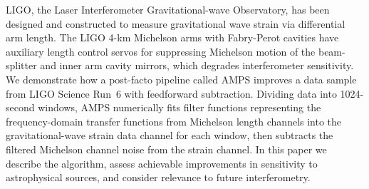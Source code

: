 LIGO, the Laser Interferometer Gravitational-wave Observatory, has been designed and constructed to measure gravitational wave strain via differential arm length. The LIGO 4-km Michelson arms with Fabry-Perot cavities have auxiliary length control servos for suppressing Michelson motion of the beam-splitter and inner arm cavity mirrors, which degrades interferometer sensitivity. We demonstrate how a post-facto pipeline called AMPS improves a data sample from LIGO Science Run~6 with feedforward subtraction. Dividing data into 1024-second windows, AMPS numerically fits filter functions representing the frequency-domain transfer functions from Michelson length channels into the gravitational-wave strain data channel for each window, then subtracts the filtered Michelson channel noise from the strain channel. In this paper we describe the algorithm, assess achievable improvements in sensitivity to astrophysical sources, and consider relevance to future interferometry.





